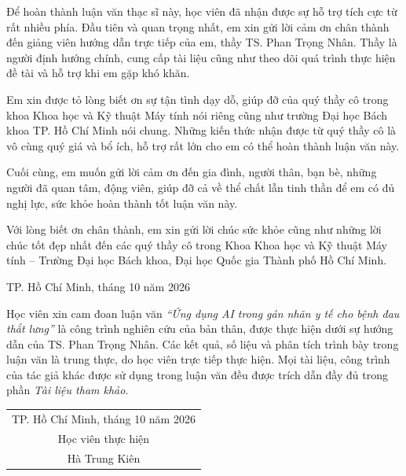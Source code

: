 \documentclass[12pt]{report}
\begin{document}

\author{Hà Trung Kiên - 2470723}
\beforepreface
{}

Để hoàn thành luận văn thạc sĩ này, học viên đã nhận được sự hỗ trợ tích cực từ rất nhiều phía. Đầu tiên và quan trọng nhất, em xin gửi lời cảm ơn chân thành đến giảng viên hướng dẫn trực tiếp của em, thầy TS. Phan Trọng Nhân. Thầy là người định hướng chính, cung cấp tài liệu cũng như theo dõi quá trình thực hiện đề tài và hỗ trợ khi em gặp khó khăn.

Em xin được tỏ lòng biết ơn sự tận tình dạy dỗ, giúp đỡ của quý thầy cô trong khoa Khoa học và Kỹ thuật Máy tính nói riêng cũng như trường Đại học Bách khoa TP. Hồ Chí Minh nói chung. Những kiến thức nhận được từ quý thầy cô là vô cùng quý giá và bổ ích, hỗ trợ rất lớn cho em có thể hoàn thành luận văn này.

Cuối cùng, em muốn gửi lời cảm ơn đến gia đình, người thân, bạn bè, những người đã quan tâm, động viên, giúp đỡ cả về thể chất lẫn tinh thần để em có đủ nghị lực, sức khỏe hoàn thành tốt luận văn này.

Với lòng biết ơn chân thành, em xin gửi lời chúc sức khỏe cũng như những lời chúc tốt đẹp nhất đến các quý thầy cô trong Khoa Khoa học và Kỹ thuật Máy tính -- Trường Đại học Bách khoa, Đại học Quốc gia Thành phố Hồ Chí Minh.

\begin{flushright}
TP. Hồ Chí Minh, tháng 10 năm 2026
\end{flushright}

Học viên xin cam đoan luận văn \textit{``Ứng dụng AI trong gán nhãn y tế cho bệnh đau thắt lưng''} là công trình nghiên cứu của bản thân, được thực hiện dưới sự hướng dẫn của TS. Phan Trọng Nhân. Các kết quả, số liệu và phân tích trình bày trong luận văn là trung thực, do học viên trực tiếp thực hiện. Mọi tài liệu, công trình của tác giả khác được sử dụng trong luận văn đều được trích dẫn đầy đủ trong phần \textit{Tài liệu tham khảo}.

\begin{flushright}
\begin{tabular}{c}
    TP. Hồ Chí Minh, tháng 10 năm 2026\\
    Học viên thực hiện\\
    Hà Trung Kiên
\end{tabular}
\end{flushright}
\end{document}
